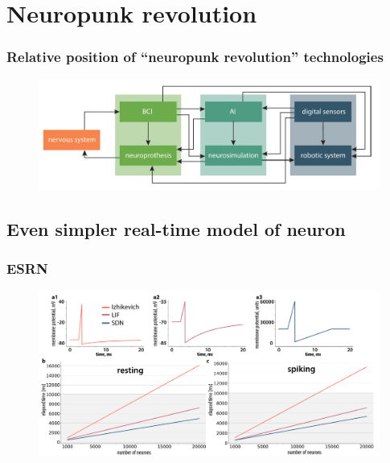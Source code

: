 \documentclass[12pt, aspectratio=169]{beamer}
\begin{document}
\section{Neuropunk revolution}
\begin{frame}
  \frametitle{Relative position of ``neuropunk revolution'' technologies}
  \begin{figure}
    \includegraphics[width=1.0\linewidth]{neuropunk_technologies}
  \end{figure}
\end{frame}
\subsection{Even simpler real-time model of neuron}
\begin{frame}
  \frametitle{ESRN}
  \begin{figure}
    \includegraphics[width=0.8\linewidth]{states}
  \end{figure}
\end{frame}
\end{document}
